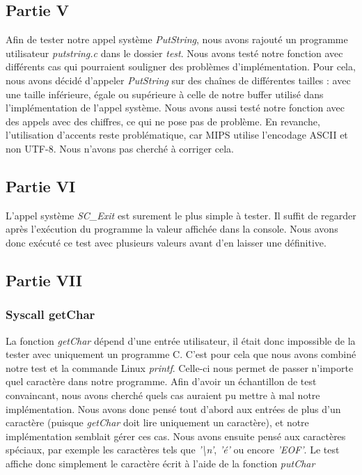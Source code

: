 \documentclass{article}
\begin{document}
\subsection{Partie V}
Afin de tester notre appel système \textit{PutString}, nous avons rajouté un
programme utilisateur \textit{putstring.c }dans le dossier \textit{test}. Nous
avons testé notre fonction avec différents cas qui pourraient souligner des
problèmes d'implémentation. Pour cela, nous avons décidé d'appeler
\textit{PutString} sur des chaînes de différentes tailles : avec une taille
inférieure, égale ou supérieure à celle de notre buffer utilisé dans
l'implémentation de l'appel système. Nous avons aussi testé notre fonction avec
des appels avec des chiffres, ce qui ne pose pas de problème. En revanche,
l'utilisation d'accents reste problématique, car MIPS utilise l'encodage ASCII
et non UTF-8. Nous n'avons pas cherché à corriger cela.

\subsection{Partie VI}
L'appel système \textit{SC\_Exit} est surement le plus simple à tester.
Il suffit de regarder après l'exécution du programme la valeur affichée dans la console.
Nous avons donc exécuté ce test avec plusieurs valeurs avant d'en laisser une définitive.

\subsection{Partie VII}
\subsubsection{Syscall getChar}
La fonction \textit{getChar} dépend d'une entrée utilisateur, il était donc
impossible de la tester avec uniquement un programme C. C'est pour cela que
nous avons combiné notre test et la commande Linux \textit{printf}. Celle-ci
nous permet de passer n'importe quel caractère dans notre programme. Afin
d'avoir un échantillon de test convaincant, nous avons cherché quels cas
auraient pu mettre à mal notre implémentation. Nous avons donc pensé tout
d'abord aux entrées de plus d'un caractère (puisque \textit{getChar} doit lire
uniquement un caractère), et notre implémentation semblait gérer ces cas. Nous
avons ensuite pensé aux caractères spéciaux, par exemple les caractères tels
que \textit{'\textbackslash n'}, \textit{'é'} ou encore \textit{'EOF'}. Le test
affiche donc simplement le caractère écrit à l'aide de la fonction
\textit{putChar}
\end{document}

